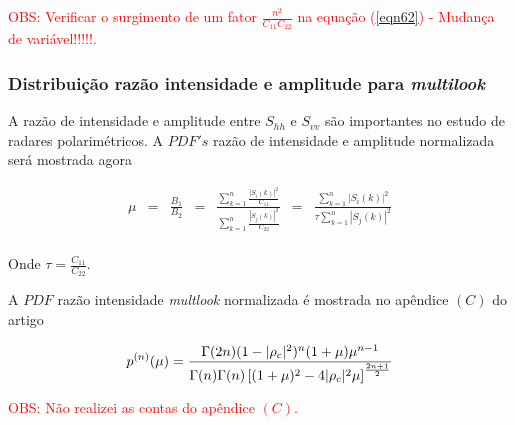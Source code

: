 \textcolor{red}{OBS: Verificar o surgimento de um fator $\frac{n^2}{C_{11}C_{22}}$ na equação  (\ref{eqn62}) - Mudança de variável!!!!!.}

\subsubsection{Distribuição razão intensidade e amplitude para {\it multilook}}

A razão de intensidade e amplitude entre $S_{hh}$ e $S_{vv}$ são importantes no estudo de radares polarimétricos. A $PDF's$ razão de intensidade e amplitude normalizada será mostrada agora

\begin{equation}\label{eqn63}
\begin{array}{ccccccc}
	\mu&=&\frac{B_1}{B_2}&=&\frac{\sum_{k=1}^{n}\frac{|S_i(k)|^2}{C_{11}}}{\sum_{k=1}^{n}\frac{|S_j(k)|^2}{C_{22}}}&=&\frac{\sum_{k=1}^{n}|S_i(k)|^2}{\tau\sum_{k=1}^{n}|S_j(k)|^2}\\
\end{array}
\end{equation}

Onde $\tau=\frac{C_{11}}{C_{22}}$.

A $PDF$ razão intensidade {\it multlook} normalizada é mostrada no apêndice $(C)$ do artigo \cite{lee}  


\begin{equation}\label{eqn64}
	p^{(n)}(\mu)=\frac{\Gamma(2n)(1-|\rho_c|^2)^{n}(1+\mu)\mu^{n-1}}{\Gamma(n)\Gamma(n)\left[(1+\mu)^2-4|\rho_c|^2\mu \right]^{\frac{2n+1}{2}}}\\
\end{equation}

\textcolor{red}{OBS: Não realizei as contas do apêndice $(C)$.}

